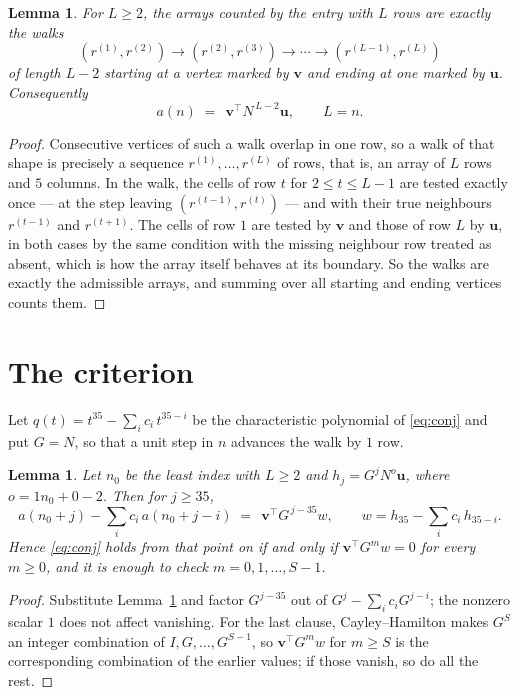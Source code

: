 \documentclass[11pt,a4paper]{article}
\theoremstyle{plain}
\newtheorem{lemma}[theorem]{Lemma}
\theoremstyle{definition}
\begin{document}
\begin{lemma}\label{lem:walk}
For $L\ge2$, the arrays counted by the entry with $L$ rows are exactly the walks
\[
(r^{(1)},r^{(2)})\to(r^{(2)},r^{(3)})\to\cdots\to(r^{(L-1)},r^{(L)})
\]
of length $L-2$ starting at a vertex marked by $\mathbf{v}$ and ending at one marked by
$\mathbf{u}$. Consequently
\[
a(n)\;=\;\,\mathbf{v}^{\!\top}N^{\,L-2}\mathbf{u},\qquad L=n .
\]
\end{lemma}

\begin{proof}
Consecutive vertices of such a walk overlap in one row, so a walk of that shape is
precisely a sequence $r^{(1)},\dots,r^{(L)}$ of rows, that is, an array of $L$ rows
and $5$ columns. In the walk, the cells of row $t$ for $2\le t\le L-1$ are tested
exactly once --- at the step leaving $(r^{(t-1)},r^{(t)})$ --- and with their true
neighbours $r^{(t-1)}$ and $r^{(t+1)}$. The cells of row $1$ are tested by
$\mathbf{v}$ and those of row $L$ by $\mathbf{u}$, in both cases by the same condition
with the missing neighbour row treated as absent, which is how the array itself behaves at
its boundary. So the walks are exactly the admissible arrays, and summing over all starting
and ending vertices counts them.
\end{proof}

\section{The criterion}

Let $q(t)=t^{35}-\sum_i c_i\,t^{35-i}$ be the characteristic polynomial of
\eqref{eq:conj} and put $G=N$, so that a unit step in $n$ advances the walk by
$1$ row.

\begin{lemma}\label{lem:crit}
Let $n_0$ be the least index with $L\ge2$ and $h_j=G^{j}N^{o}\mathbf{u}$, where
$o=1n_0+0-2$. Then for $j\ge35$,
\[
a(n_0+j)-\sum_i c_i\,a(n_0+j-i)\;=\;\,\mathbf{v}^{\!\top}G^{\,j-35}w,
\qquad w=h_{35}-\sum_i c_i\,h_{35-i} .
\]
Hence \eqref{eq:conj} holds from that point on if and only if
$\mathbf{v}^{\!\top}G^{m}w=0$ for every $m\ge0$, and it is enough to check
$m=0,1,\dots,S-1$.
\end{lemma}

\begin{proof}
Substitute Lemma~\ref{lem:walk} and factor $G^{j-35}$ out of
$G^{j}-\sum_ic_iG^{j-i}$; the nonzero scalar $1$ does not affect
vanishing. For the last clause, Cayley--Hamilton makes $G^{S}$ an integer combination of
$I,G,\dots,G^{S-1}$, so $\mathbf{v}^{\!\top}G^{m}w$ for $m\ge S$ is the corresponding
combination of the earlier values; if those vanish, so do all the rest.
\end{proof}
\end{document}
